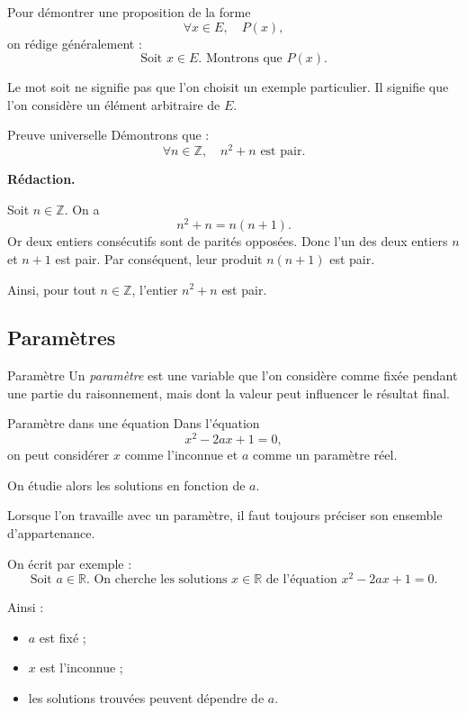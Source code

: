 \documentclass[11pt,a4paper]{article}
\begin{document}
\begin{retenirbox}
Pour démontrer une proposition de la forme
\[
\forall x\in E,\quad P(x),
\]
on rédige généralement :
\[
\text{Soit } x\in E. \text{ Montrons que } P(x).
\]

Le mot \og soit \fg{} ne signifie pas que l'on choisit un exemple particulier. Il signifie que l'on considère un élément arbitraire de $E$.
\end{retenirbox}

\begin{exemplebox}{Preuve universelle}{}
Démontrons que :
\[
\forall n\in\mathbb{Z},\quad n^2+n \text{ est pair}.
\]

\textbf{Rédaction.}

Soit $n\in\mathbb{Z}$. On a
\[
n^2+n=n(n+1).
\]
Or deux entiers consécutifs sont de parités opposées. Donc l'un des deux entiers $n$ et $n+1$ est pair. Par conséquent, leur produit $n(n+1)$ est pair.

Ainsi, pour tout $n\in\mathbb{Z}$, l'entier $n^2+n$ est pair.
\end{exemplebox}

\subsection{Paramètres}

\begin{definitionbox}{Paramètre}{}
Un \emph{paramètre} est une variable que l'on considère comme fixée pendant une partie du raisonnement, mais dont la valeur peut influencer le résultat final.
\end{definitionbox}

\begin{exemplebox}{Paramètre dans une équation}{}
Dans l'équation
\[
x^2-2ax+1=0,
\]
on peut considérer $x$ comme l'inconnue et $a$ comme un paramètre réel.

On étudie alors les solutions en fonction de $a$.
\end{exemplebox}

\begin{methodebox}
Lorsque l'on travaille avec un paramètre, il faut toujours préciser son ensemble d'appartenance.

On écrit par exemple :
\[
\text{Soit } a\in\mathbb{R}. \text{ On cherche les solutions } x\in\mathbb{R} \text{ de l'équation } x^2-2ax+1=0.
\]

Ainsi :
\begin{itemize}
    \item $a$ est fixé ;
    \item $x$ est l'inconnue ;
    \item les solutions trouvées peuvent dépendre de $a$.
\end{itemize}
\end{methodebox}
\end{document}
